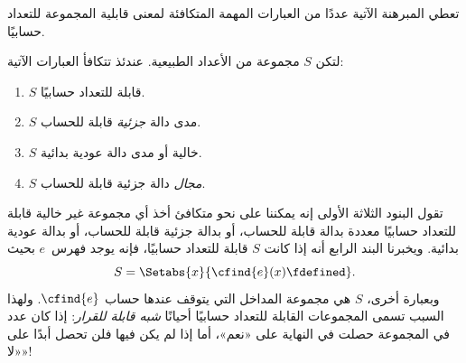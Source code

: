 \documentclass[../../../include/open-logic-section]{subfiles}
\begin{document}


تعطي المبرهنة الآتية عددًا من العبارات المهمة المتكافئة لمعنى قابلية
المجموعة للتعداد حسابيًا.

\begin{thm}
لتكن $S$ مجموعة من الأعداد الطبيعية. عندئذ تتكافأ العبارات الآتية:
\begin{enumerate}
\item{} $S$ قابلة للتعداد حسابيًا.
\item{} $S$ مدى دالة \emph{جزئية} قابلة للحساب.
\item{} $S$ خالية أو مدى دالة عودية بدائية.
\item{} $S$ \emph{مجال} دالة جزئية قابلة للحساب.
\end{enumerate}
\end{thm}

\begin{explain}
تقول البنود الثلاثة الأولى إنه يمكننا على نحو متكافئ أخذ أي مجموعة غير
خالية قابلة للتعداد حسابيًا معددة بدالة قابلة للحساب، أو بدالة جزئية
قابلة للحساب، أو بدالة عودية بدائية. ويخبرنا البند الرابع أنه إذا كانت
$S$ قابلة للتعداد حسابيًا، فإنه يوجد فهرس~$e$ بحيث
\[
S = \Setabs{x}{\cfind{e}(x) \fdefined}.
\]
وبعبارة أخرى، $S$ هي مجموعة المداخل التي يتوقف عندها حساب
$\cfind{e}$. ولهذا السبب تسمى المجموعات القابلة للتعداد حسابيًا أحيانًا
\emph{شبه قابلة للقرار}: إذا كان عدد في المجموعة حصلت في النهاية على
«نعم»، أما إذا لم يكن فيها فلن تحصل أبدًا على «لا»!{}
\end{explain}
\end{document}
